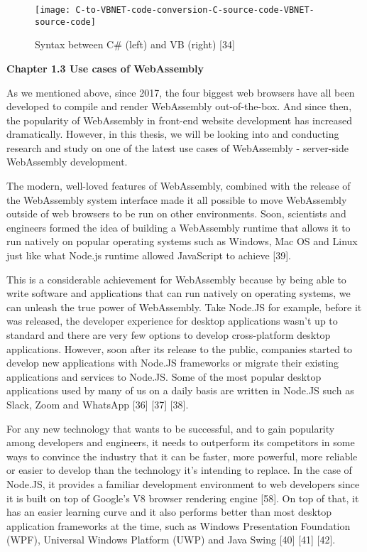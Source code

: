\bigskip
\begin{figure}[hp]
\centering
\texttt{[image: C-to-VBNET-code-conversion-C-source-code-VBNET-source-code]}
\caption{\footnotesize{Syntax between C\# (left) and VB (right) [34]}}
\captionsetup{aboveskip=0pt,font=it}
\end{figure}
\bigskip

\textbf{{\Large Chapter 1.3 Use cases of WebAssembly}}
\bigskip

As we mentioned above, since 2017, the four biggest web browsers have all been developed to compile and render WebAssembly out-of-the-box. And since then, the popularity of WebAssembly in front-end website development has increased dramatically. However, in this thesis, we will be looking into and conducting research and study on one of the latest use cases of WebAssembly - server-side WebAssembly development.

The modern, well-loved features of WebAssembly, combined with the release of the WebAssembly system interface made it all possible to move WebAssembly outside of web browsers to be run on other environments. Soon, scientists and engineers formed the idea of building a WebAssembly runtime that allows it to run natively on popular operating systems such as Windows, Mac OS and Linux just like what Node.js runtime allowed JavaScript to achieve [39].

This is a considerable achievement for WebAssembly because by being able to write software and applications that can run natively on operating systems, we can unleash the true power of WebAssembly. Take Node.JS for example, before it was released, the developer experience for desktop applications wasn't up to standard and there are very few options to develop cross-platform desktop applications. However, soon after its release to the public, companies started to develop new applications with Node.JS frameworks or migrate their existing applications and services to Node.JS. Some of the most popular desktop applications used by many of us on a daily basis are written in Node.JS such as Slack, Zoom and WhatsApp [36] [37] [38].

For any new technology that wants to be successful, and to gain popularity among developers and engineers, it needs to outperform its competitors in some ways to convince the industry that it can be faster, more powerful, more reliable or easier to develop than the technology it's intending to replace. In the case of Node.JS, it provides a familiar development environment to web developers since it is built on top of Google's V8 browser rendering engine [58]. On top of that, it has an easier learning curve and it also performs better than most desktop application frameworks at the time, such as Windows Presentation Foundation (WPF), Universal Windows Platform (UWP) and Java Swing [40] [41] [42].

